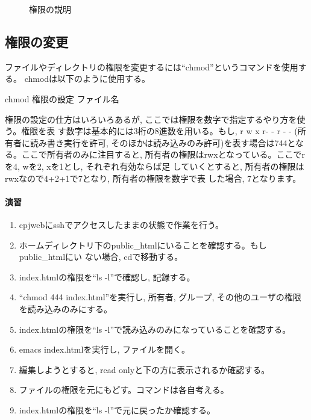 \begin{figure}[htbp]
\begin{center}
\caption{権限の説明}
\label{fig:permission}
\end{center}
\end{figure}

\subsection{権限の変更}
ファイルやディレクトリの権限を変更するには``chmod''というコマンドを使用する。
chmodは以下のように使用する。

\vspace{3mm}
  chmod  権限の設定  ファイル名

\vspace{3mm}
権限の設定の仕方はいろいろあるが, ここでは権限を数字で指定するやり方を使う。権限を表
す数字は基本的には3桁の8進数を用いる。もし, r w x r- - r - - (所有者に読み書き実行を許可,
そのほかは読み込みのみ許可)を表す場合は744となる。ここで所有者のみに注目すると,
所有者の権限はrwxとなっている。ここでrを4, wを2, xを1とし, それぞれ有効ならば足
していくとすると, 所有者の権限はrwxなので4+2+1で7となり, 所有者の権限を数字で表
した場合, 7となります。

\paragraph{演習}
\begin{enumerate}
\item cpjwebにsshでアクセスしたままの状態で作業を行う。
\item ホームディレクトリ下のpublic\_htmlにいることを確認する。もしpublic\_htmlにい
      ない場合, cdで移動する。
\item index.htmlの権限を``ls -l''で確認し, 記録する。
\item ``chmod 444 index.html''を実行し, 所有者, グループ, その他のユーザの権限を読み込みのみにする。
\item index.htmlの権限を``ls -l''で読み込みのみになっていることを確認する。
\item emacs index.htmlを実行し, ファイルを開く。
\item 編集しようとすると, read onlyと下の方に表示されるか確認する。
\item ファイルの権限を元にもどす。コマンドは各自考える。
\item index.htmlの権限を``ls -l''で元に戻ったか確認する。
\end{enumerate}

